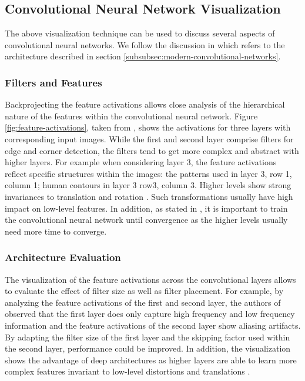 \subsection{Convolutional Neural Network Visualization}

The above visualization technique can be used to discuss several aspects of convolutional neural networks. We follow the discussion in \cite{ZeilerFergus:2013} which refers to the architecture described in section \ref{subsubsec:modern-convolutional-networks}.

\subsubsection{Filters and Features}

Backprojecting the feature activations allows close analysis of the hierarchical nature of the features within the convolutional neural network. Figure \ref{fig:feature-activations}, taken from \cite{ZeilerFergus:2013}, shows the activations for three layers with corresponding input images. While the first and second layer comprise filters for edge and corner detection, the filters tend to get more complex and abstract with higher layers. For example when considering layer 3, the feature activations reflect specific structures within the images: the patterns used in layer 3, row 1, column 1; human contours in layer 3 row3, column 3. Higher levels show strong invariances to translation and rotation \cite{ZeilerFergus:2013}. Such transformations usually have high impact on low-level features. In addition, as stated in \cite{ZeilerFergus:2013}, it is important to train the convolutional neural network until convergence as the higher levels usually need more time to converge.

\subsubsection{Architecture Evaluation}

The visualization of the feature activations across the convolutional layers allows to evaluate the effect of filter size as well as filter placement. For example, by analyzing the feature activations of the first and second layer, the authors of \cite{ZeilerFergus:2013} observed that the first layer does only capture high frequency and low frequency information and the feature activations of the second layer show aliasing artifacts. By adapting the filter size of the first layer and the skipping factor used within the second layer, performance could be improved. In addition, the visualization shows the advantage of deep architectures as higher layers are able to learn more complex features invariant to low-level distortions and translations \cite{ZeilerFergus:2013}.